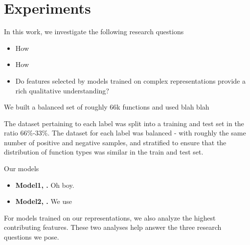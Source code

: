 \section{Experiments}
\label{sec:experiments}
In this work, we investigate the following research questions
\begin{itemize}
	\item How
	\item How
	\item Do features selected by models trained on complex representations provide a rich qualitative understanding?
\end{itemize}

We built a balanced set of roughly $66$k functions and used blah blah

The dataset pertaining to each label was split into a training and test set in the ratio $66\%$-$33\%$. The dataset for each label was balanced - with roughly the same number of positive and negative samples, and stratified to ensure that the distribution of function types was similar in the train and test set. 

Our models
\begin{itemize}[noitemsep,topsep=0pt,parsep=0pt,partopsep=0pt]
	\item \textbf{Model1, .} Oh boy.
	
	\item \textbf{Model2, \TokNoOp.} We use 
	
\end{itemize}

For models trained on our representations, we also analyze the highest contributing features. These two analyses help answer the three research questions we pose.

